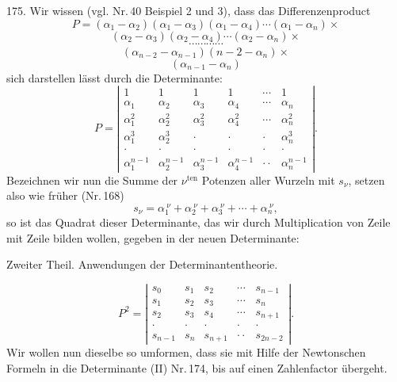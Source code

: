 175.  Wir wissen (vgl. Nr.\,40 Beispiel 2 und 3), dass das Differenzenproduct
\[
P = (\alpha_1 - \alpha_2)(\alpha_1 - \alpha_3)(\alpha_1 - \alpha_4) \cdots (\alpha_1 - \alpha_n) \times
\]
\[
(\alpha_2 - \alpha_3)(\alpha_2 - \alpha_4) \cdots (\alpha_2 - \alpha_n) \times
\]
\[
\cdots \cdots \cdots \cdots
\]
\[
(\alpha_{n-2} - \alpha_{n-1})(n-2 - \alpha_n) \times %
\]
\[
(\alpha_{n-1} - \alpha_n)
\]
sich darstellen lässt durch die Determinante:
\[
P =
\left|
\begin{array}{cccccc}
1 & 1 & 1 & 1 & \cdots & 1 \\
\alpha_1 & \alpha_2 & \alpha_3 & \alpha_4 & \cdots & \alpha_n \\
\alpha_1^2 & \alpha_2^2 & \alpha_3^2 & \alpha_4^2 & \cdots & \alpha_n^2 \\
\alpha_1^3 & \alpha_2^3 & \cdot & \cdot & \cdot & \alpha_n^3 \\
\cdot & \cdot & \cdot & \cdot & \cdot & \cdot \\
\alpha_1^{n-1} & \alpha_2^{n-1} & \alpha_3^{n-1} & \alpha_4^{n-1} & \cdot\cdot & \alpha_n^{n-1}
\end{array}
\right| .
\]
Bezeichnen wir nun die Summe der $\nu^{\mathrm{ten}}$ Potenzen aller Wurzeln mit $s_\nu$, setzen also wie früher (Nr.\,168)
\[
s_\nu = \alpha_1^{\ \nu} + \alpha_2^{\ \nu} + \alpha_3^{\ \nu} + \cdots + \alpha_n^{\ \nu},
\]
so ist das Quadrat dieser Determinante, das wir durch Multiplication von Zeile mit Zeile bilden wollen, gegeben in der neuen Determinante:



Zweiter Theil. Anwendungen der Determinantentheorie.

\[
P^2 =
\left|
\begin{array}{ccccc}
s_0 & s_1 & s_2 & \cdots & s_{n-1} \\
s_1 & s_2 & s_3 & \cdots & s_n \\
s_2 & s_3 & s_4 & \cdots & s_{n+1} \\
\cdot & \cdot & \cdot & \cdot & \cdot \\
s_{n-1} & s_n & s_{n+1} & \cdot\cdot & s_{2n-2}
\end{array}
\right| .
\]
Wir wollen nun dieselbe so umformen, dass sie mit Hilfe der Newton\-schen Formeln in die Determinante (II) Nr.\,174, bis auf einen Zahlenfactor übergeht.

